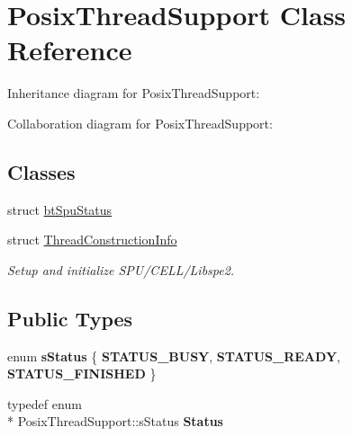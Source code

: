 \hypertarget{class_posix_thread_support}{\section{Posix\+Thread\+Support Class Reference}
\label{class_posix_thread_support}
}


Inheritance diagram for Posix\+Thread\+Support\+:


Collaboration diagram for Posix\+Thread\+Support\+:
\subsection*{Classes}
\begin{DoxyCompactItemize}
\item 
struct \hyperlink{struct_posix_thread_support_1_1bt_spu_status}{bt\+Spu\+Status}
\item 
struct \hyperlink{struct_posix_thread_support_1_1_thread_construction_info}{Thread\+Construction\+Info}
\begin{DoxyCompactList}\small\item\em Setup and initialize S\+P\+U/\+C\+E\+L\+L/\+Libspe2. \end{DoxyCompactList}\end{DoxyCompactItemize}
\subsection*{Public Types}
\begin{DoxyCompactItemize}
\item 
\hypertarget{class_posix_thread_support_abfdc59ca08a829e71676df2525503e1f}{enum {\bfseries s\+Status} \{ {\bfseries S\+T\+A\+T\+U\+S\+\_\+\+B\+U\+S\+Y}, 
{\bfseries S\+T\+A\+T\+U\+S\+\_\+\+R\+E\+A\+D\+Y}, 
{\bfseries S\+T\+A\+T\+U\+S\+\_\+\+F\+I\+N\+I\+S\+H\+E\+D}
 \}}\label{class_posix_thread_support_abfdc59ca08a829e71676df2525503e1f}

\item 
\hypertarget{class_posix_thread_support_a7344692b4f763cafbe540c8dac18c5c8}{typedef enum \\*
Posix\+Thread\+Support\+::s\+Status {\bfseries Status}}\label{class_posix_thread_support_a7344692b4f763cafbe540c8dac18c5c8}

\end{DoxyCompactItemize}
